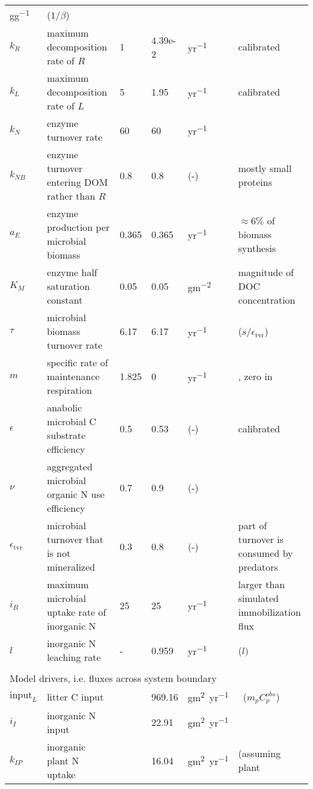\begin{table}[t]
\begin{tabular}{lp{6cm}lllp{5.5cm}}
\unit{gg^{-1}} & \citep{Perveen14} ($1/\beta$) \\
$k_R$ &  maximum decomposition rate of $R$ & 1 & 4.39e-2 & \unit{yr^{-1}}
& calibrated \\
$k_L$ &  maximum decomposition rate of $L$ & 5 & 1.95 & \unit{yr^{-1}}
& calibrated \\
$k_N$ &  enzyme turnover rate &  60  & 60 & \unit{yr^{-1}} & \citep{Burns13} \\
$k_{NB}$ & enzyme turnover entering DOM rather than $R$ & 
0.8 & 0.8 & (-) & mostly small proteins \\
$a_{E}$ &  enzyme production per microbial biomass & 0.365 & 0.365 &
\unit{yr^{-1}} & $\approx 6\%$ of biomass synthesis \\ 
$K_{M}$ &  enzyme half saturation constant & 0.05 & 0.05 &
\unit{gm^{-2}} & magnitude of DOC concentration \\
$\tau$ &  microbial biomass turnover rate & 6.17 & 6.17 & \unit{yr^{-1}} &
\citep{Perveen14} ($s/\epsilon_{\operatorname{tvr}}$) \\
$m$ & specific rate of maintenance respiration & 1.825 & 0 & 
\unit{yr^{-1}} & \citep{Bodegom07}, zero in \citep{Perveen14} \\
$\epsilon$ & anabolic microbial C substrate efficiency & 0.5 & 0.53 &
(-) & calibrated \\ %
$\nu$ & aggregated microbial organic N use efficiency & 0.7 &
0.9 & (-) & \citep{Manzoni08} \\
$\epsilon_{\operatorname{tvr}}$ & microbial turnover that is not
mineralized & 0.3 & 0.8 & (-) & part of turnover is consumed by
predators
\\
$i_{B}$ & maximum microbial uptake rate of inorganic N & 25 & 25 &
\unit{yr^{-1}} & larger than simulated immobilization flux \\
$l$ & inorganic N leaching rate & - & 0.959 &
\unit{yr^{-1}} & \citep{Perveen14} ($l)$ \\
\\
\multicolumn{6}{l}{Model drivers, i.e. fluxes across system boundary}  \\ 
$\mathrm{input}_{L}$ & litter C input & & 969.16 &
\unit{gm^2yr^{-1}} & \citep{Perveen14} \, ($m_p C^{obs}_p$)\\
$i_{I}$ & inorganic N input & & 22.91 & \unit{gm^2yr^{-1}} 
& \citep{Perveen14} \\
$k_{IP}$ & inorganic plant N uptake & & 16.04 & 
\unit{gm^2yr^{-1}} & \citep{Perveen14} (assuming plant

\end{tabular}
\end{table}
